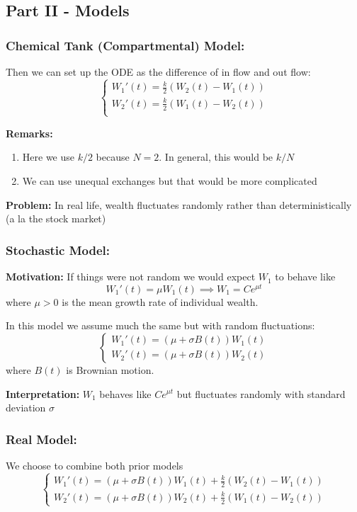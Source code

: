 \documentclass[12pt]{article}
\begin{document}
\subsection*{Part II - Models}
\subsubsection*{Chemical Tank (Compartmental) Model:}
\begin{center}
\end{center}

Then we can set up the ODE as the difference of in flow and out flow: 
\[\begin{cases}
    W_1'(t) = \frac{k}{2}(W_2(t) - W_1(t))\\
    W_2'(t) = \frac{k}{2}(W_1(t) - W_2(t))\\
\end{cases}\]

\textbf{Remarks:}
\begin{enumerate}
    \item Here we use $k/2$ because $N=2$. In general, this would be $k/N$
    \item We can use unequal exchanges but that would be more complicated
\end{enumerate}

\textbf{Problem:} In real life, wealth fluctuates randomly rather than deterministically (a la the stock market)

\subsubsection*{Stochastic Model:} 
\textbf{Motivation:} If things were not random we would expect $W_1$ to behave like 
\[W_1'(t) = \mu W_1(t) \implies W_1 = Ce^{\mu t}\]
where $\mu > 0$ is the mean growth rate of individual wealth. 

In this model we assume much the same but with random fluctuations:
\[\begin{cases}
    W_1'(t) = (\mu + \sigma B(t)) W_1(t)\\
    W_2'(t) = (\mu + \sigma B(t)) W_2(t)
\end{cases}\]
where $B(t)$ is Brownian motion. 

\textbf{Interpretation:} $W_1$ behaves like $Ce^{\mu t}$ but fluctuates randomly with standard deviation $\sigma$

\subsubsection*{Real Model:} 
We choose to combine both prior models
\[\begin{cases}
    W_1'(t) = (\mu + \sigma B(t)) W_1(t) + \frac{k}{2}(W_2(t) - W_1(t))\\
    W_2'(t) = (\mu + \sigma B(t)) W_2(t) + \frac{k}{2}(W_1(t) - W_2(t))
\end{cases}\]
\end{document}
